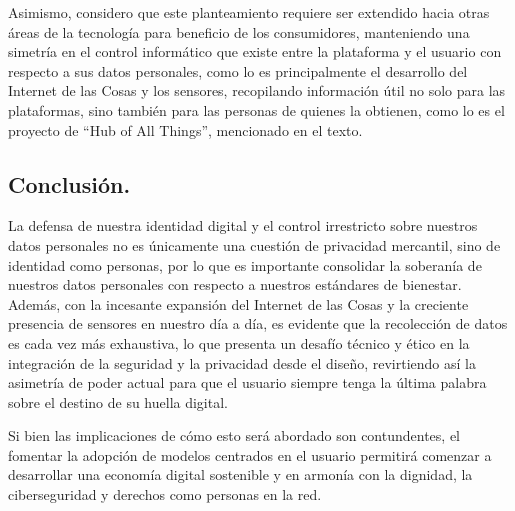 Asimismo, considero que este planteamiento requiere ser extendido hacia otras áreas de la tecnología para beneficio de los consumidores, manteniendo una simetría en el control informático que existe entre la plataforma y el usuario con respecto a sus datos personales, como lo es principalmente el desarrollo del Internet de las Cosas y los sensores, recopilando información útil no solo para las plataformas, sino también para las personas de quienes la obtienen, como lo es el proyecto de ``Hub of All Things'', mencionado en el texto. 

\subsection*{Conclusión.}

La defensa de nuestra identidad digital y el control irrestricto sobre nuestros datos personales no es únicamente una cuestión de privacidad mercantil, sino de identidad como personas, por lo que es importante consolidar la soberanía de nuestros datos personales con respecto a nuestros estándares de bienestar. Además, con la incesante expansión del Internet de las Cosas y la creciente presencia de sensores en nuestro día a día, es evidente que la recolección de datos es cada vez más exhaustiva, lo que presenta un desafío técnico y ético en la integración de la seguridad y la privacidad desde el diseño, revirtiendo así la asimetría de poder actual para que el usuario siempre tenga la última palabra sobre el destino de su huella digital.

Si bien las implicaciones de cómo esto será abordado son contundentes, el fomentar la adopción de modelos centrados en el usuario permitirá comenzar a desarrollar una economía digital sostenible y en armonía con la dignidad, la ciberseguridad y derechos como personas en la red.